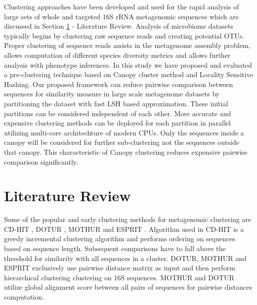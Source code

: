 \documentclass[10pt, conference, compsocconf]{IEEEtran}
\begin{document}
Clustering approaches have been developed and used for the rapid analysis of large sets of whole and targeted 16S rRNA metagenomic sequences which are discussed in Section \ref{sec:1} - Literature Review. Analysis of microbiome datasets typically begins by clustering raw sequence reads and creating potential OTUs. Proper clustering of sequence reads assists in the metagenome assembly problem, allows computation of different species diversity metrics and allows further analysis with phenotype inferences. In this study we have proposed and evaluated a pre-clustering technique based on Canopy cluster method and Locality Sensitive Hashing. Our proposed framework can reduce pairwise comparison between sequences for similarity measure in large scale metagenome datasets by partitioning the dataset with fast LSH based approximation. These initial partitions can be considered independent of each other. More accurate and expensive clustering methods can be deployed for each partition in parallel utilizing multi-core architechture of modern CPUs. Only the sequences inside a canopy will be considered for further sub-clustering not the sequences outside that canopy. This characteristic of Canopy clustering reduces expensive pairwise comparison significantly.       

\section{Literature Review}
\label{sec:1}
Some of the popular and early clustering methods for metagenomic clustering are CD-HIT \cite{MARCDhit}, DOTUR \cite{MARDOTUR}, MOTHUR \cite{MARMothur} and ESPRIT \cite{MAREspirit}. Algorithm used in CD-HIT is a greedy incremental clustering algorithm and performs ordering on sequences based on sequence length. Subsequent comparisons have to fall above the threshold for similarity with all sequences in a cluster. DOTUR, MOTHUR and ESPRIT exclusively use pairwise distance matrix as input and then perform hierarchical clustering clustering on 16S sequences. MOTHUR and DOTUR utilize global alignment score between all pairs of sequences for pairwise distances computation. 
\end{document}
